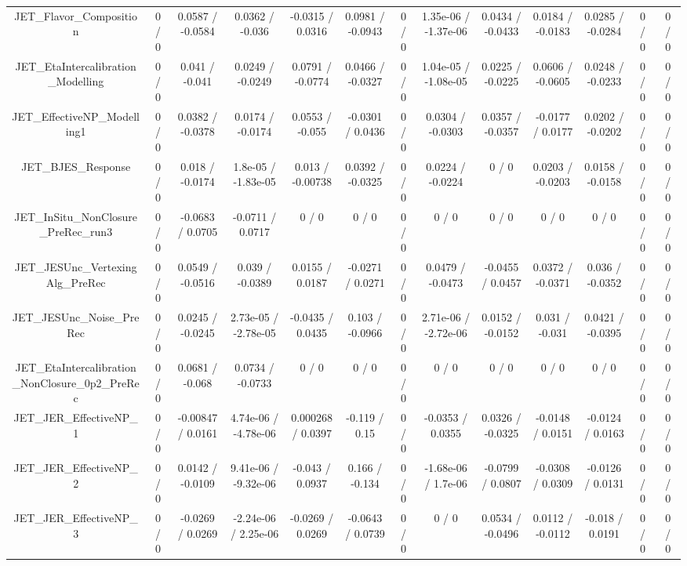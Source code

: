 \documentclass[10pt]{article}
\begin{document}
\begin{table}[htbp]
\begin{center}
\begin{tabular}{|c|c|c|c|c|c|c|c|c|c|c|c|c|}
  JET_Flavor_Composition & 0 / 0 & 0.0587 / -0.0584 & 0.0362 / -0.036 & -0.0315 / 0.0316 & 0.0981 / -0.0943 & 0 / 0 & 1.35e-06 / -1.37e-06 & 0.0434 / -0.0433 & 0.0184 / -0.0183 & 0.0285 / -0.0284 & 0 / 0 & 0 / 0 \\ 
  JET_EtaIntercalibration_Modelling & 0 / 0 & 0.041 / -0.041 & 0.0249 / -0.0249 & 0.0791 / -0.0774 & 0.0466 / -0.0327 & 0 / 0 & 1.04e-05 / -1.08e-05 & 0.0225 / -0.0225 & 0.0606 / -0.0605 & 0.0248 / -0.0233 & 0 / 0 & 0 / 0 \\ 
  JET_EffectiveNP_Modelling1 & 0 / 0 & 0.0382 / -0.0378 & 0.0174 / -0.0174 & 0.0553 / -0.055 & -0.0301 / 0.0436 & 0 / 0 & 0.0304 / -0.0303 & 0.0357 / -0.0357 & -0.0177 / 0.0177 & 0.0202 / -0.0202 & 0 / 0 & 0 / 0 \\ 
  JET_BJES_Response & 0 / 0 & 0.018 / -0.0174 & 1.8e-05 / -1.83e-05 & 0.013 / -0.00738 & 0.0392 / -0.0325 & 0 / 0 & 0.0224 / -0.0224 & 0 / 0 & 0.0203 / -0.0203 & 0.0158 / -0.0158 & 0 / 0 & 0 / 0 \\ 
  JET_InSitu_NonClosure_PreRec_run3 & 0 / 0 & -0.0683 / 0.0705 & -0.0711 / 0.0717 & 0 / 0 & 0 / 0 & 0 / 0 & 0 / 0 & 0 / 0 & 0 / 0 & 0 / 0 & 0 / 0 & 0 / 0 \\ 
  JET_JESUnc_VertexingAlg_PreRec & 0 / 0 & 0.0549 / -0.0516 & 0.039 / -0.0389 & 0.0155 / 0.0187 & -0.0271 / 0.0271 & 0 / 0 & 0.0479 / -0.0473 & -0.0455 / 0.0457 & 0.0372 / -0.0371 & 0.036 / -0.0352 & 0 / 0 & 0 / 0 \\ 
  JET_JESUnc_Noise_PreRec & 0 / 0 & 0.0245 / -0.0245 & 2.73e-05 / -2.78e-05 & -0.0435 / 0.0435 & 0.103 / -0.0966 & 0 / 0 & 2.71e-06 / -2.72e-06 & 0.0152 / -0.0152 & 0.031 / -0.031 & 0.0421 / -0.0395 & 0 / 0 & 0 / 0 \\ 
  JET_EtaIntercalibration_NonClosure_0p2_PreRec & 0 / 0 & 0.0681 / -0.068 & 0.0734 / -0.0733 & 0 / 0 & 0 / 0 & 0 / 0 & 0 / 0 & 0 / 0 & 0 / 0 & 0 / 0 & 0 / 0 & 0 / 0 \\ 
  JET_JER_EffectiveNP_1 & 0 / 0 & -0.00847 / 0.0161 & 4.74e-06 / -4.78e-06 & 0.000268 / 0.0397 & -0.119 / 0.15 & 0 / 0 & -0.0353 / 0.0355 & 0.0326 / -0.0325 & -0.0148 / 0.0151 & -0.0124 / 0.0163 & 0 / 0 & 0 / 0 \\ 
  JET_JER_EffectiveNP_2 & 0 / 0 & 0.0142 / -0.0109 & 9.41e-06 / -9.32e-06 & -0.043 / 0.0937 & 0.166 / -0.134 & 0 / 0 & -1.68e-06 / 1.7e-06 & -0.0799 / 0.0807 & -0.0308 / 0.0309 & -0.0126 / 0.0131 & 0 / 0 & 0 / 0 \\ 
  JET_JER_EffectiveNP_3 & 0 / 0 & -0.0269 / 0.0269 & -2.24e-06 / 2.25e-06 & -0.0269 / 0.0269 & -0.0643 / 0.0739 & 0 / 0 & 0 / 0 & 0.0534 / -0.0496 & 0.0112 / -0.0112 & -0.018 / 0.0191 & 0 / 0 & 0 / 0 \\ 

\end{tabular}
\end{center}
\end{table}
\end{document}
